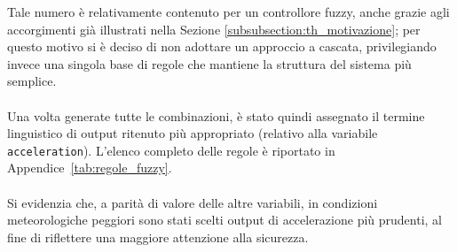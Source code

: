 \noindent Tale numero è relativamente contenuto per un controllore fuzzy, anche grazie agli accorgimenti già illustrati nella
Sezione \ref{subsubsection:th_motivazione}; per questo motivo si è deciso di non adottare un 
approccio a cascata, privilegiando invece una singola base di regole che mantiene la struttura del sistema più semplice.  
\\\\
\noindent Una volta generate tutte le combinazioni, è stato quindi assegnato il termine linguistico di output ritenuto più appropriato 
(relativo alla variabile \texttt{acceleration}).    
L'elenco completo delle regole è riportato in Appendice~\ref{tab:regole_fuzzy}.  
\\\\
\noindent Si evidenzia che, a parità di valore delle altre variabili, in condizioni meteorologiche peggiori sono stati scelti 
output di accelerazione più prudenti, al fine di riflettere una maggiore attenzione alla sicurezza.